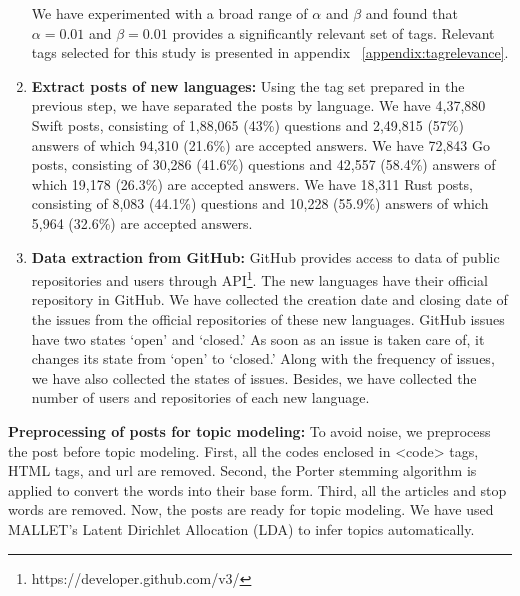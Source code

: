 \begin{enumerate}
    We have experimented with a broad range of $\alpha$ and $\beta$  and found that $\alpha = 0.01$ and $\beta=0.01$ provides a significantly relevant set of tags. Relevant tags selected for this study is presented in appendix ~\ref{appendix:tagrelevance}.

    
    \item \textbf{Extract posts of new languages:} Using the tag set prepared in the previous step, we have separated the posts by language. We have 4,37,880 Swift posts, consisting of 1,88,065 (43\%) questions and 2,49,815 (57\%) answers of which 94,310 (21.6\%) are accepted answers. We have 72,843  Go posts, consisting of 30,286 (41.6\%) questions and 42,557 (58.4\%) answers of which 19,178 (26.3\%)  are accepted answers. We have 18,311 Rust posts, consisting of 8,083 (44.1\%) questions and 10,228 (55.9\%) answers of which 5,964 (32.6\%) are accepted answers. 

     \item \textbf{Data extraction from GitHub:} GitHub provides access to data of public repositories and users through API\footnote{https://developer.github.com/v3/}. The new languages have their official repository in GitHub. We have collected the creation date and closing date of the issues from the official repositories of these new languages. GitHub issues have two states `open' and `closed.' As soon as an issue is taken care of, it changes its state from `open' to `closed.' Along with the frequency of issues, we have also collected the states of issues. Besides, we have collected the number of users and repositories of each new language.
\end{enumerate}

\iffalse

 \item \textbf{Preprocessing of posts for topic modeling:} To avoid noise, we preprocess the post before topic modeling\citep{Barua2012}. First, all the codes enclosed in <code> tags, HTML tags, and url are removed. Second, the Porter stemming algorithm\citep{Porter1997} is applied to convert the words into their base form. Third, all the articles and stop words are removed. Now, the posts are ready for topic modeling. We have used MALLET's Latent Dirichlet Allocation (LDA)\citep{Blei2003} to infer topics automatically.
 
